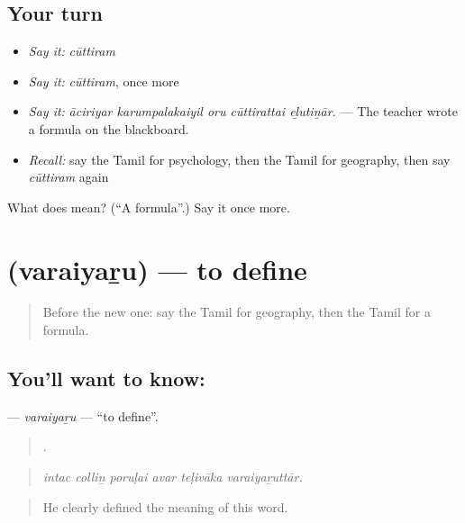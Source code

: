 \subsection*{Your turn}
\begin{itemize}
\raggedright
  \item \emph{Say it:} \emph{cūttiram}
  \item \emph{Say it:} \emph{cūttiram}, once more
  \item \emph{Say it:} \emph{āciriyar karumpalakaiyil oru cūttirattai eḻutiṉār.} — The teacher wrote a formula on the blackboard.
  \item \emph{Recall:} say the Tamil for psychology, then the Tamil for geography, then say \emph{cūttiram} again
\end{itemize}

\begin{tcolorbox}[breakable,colback=teal!4,colframe=teal!35!black,title={Before you move on}]
What does  mean? (\textquotedblleft{}A formula\textquotedblright{}.) Say it once more.
\end{tcolorbox}
\section[\texorpdfstring{\ta{வரையறு} (varaiyaṟu)}{வரையறு (varaiyaṟu)}]{ (varaiyaṟu) — to define}

\label{lesson:TA-C366-varaiyaru}



\begin{quote}
Before the new one: say the Tamil for geography, then the Tamil for a formula.
\end{quote}

\subsection*{You'll want to know: }
\textbf{} — \emph{varaiyaṟu} — \textquotedblleft{}to define\textquotedblright{}.

\begin{quote}
     .
\end{quote}

\begin{quote}
\emph{intac colliṉ poruḷai avar teḷivāka varaiyaṟuttār.}
\end{quote}

\begin{quote}
He clearly defined the meaning of this word.
\end{quote}

